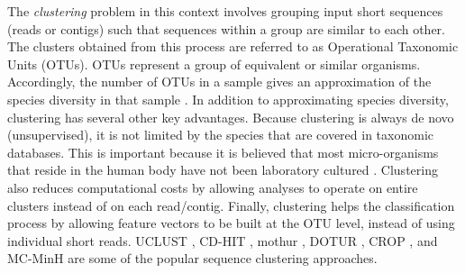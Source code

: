 The \emph{clustering} problem in this context  involves grouping input short sequences (reads or contigs)   such that sequences 
within a group are similar to each other. The clusters 
obtained from this process are referred to 
as Operational Taxonomic Units (OTUs). OTUs represent a 
group of equivalent or similar organisms. Accordingly, the 
number of OTUs in a sample gives an approximation of the 
species diversity in that sample  \cite{schloss2009introducing,schloss2005introducing,sun2009esprit}.
In addition to approximating species diversity, clustering has several other key advantages. Because 
clustering is always de novo (unsupervised), it 
is not limited by the species that are 
covered in taxonomic databases. This is  important 
because it is believed that most micro-organisms that reside 
in the human body have not been laboratory cultured \cite{handelsman04}. Clustering also reduces computational 
costs by allowing analyses to operate on entire clusters instead of 
on each read/contig. Finally, clustering helps 
the classification process by allowing feature vectors to be built
at the OTU level, instead of using individual short reads. UCLUST \cite{Edgar10}, CD-HIT \cite{Li01072006}, mothur \cite{schloss2009introducing}, DOTUR \cite{schloss2005introducing}, CROP \cite{Hao01032011}, and MC-MinH \cite{sdm2013a} are some of the popular sequence clustering approaches. 

